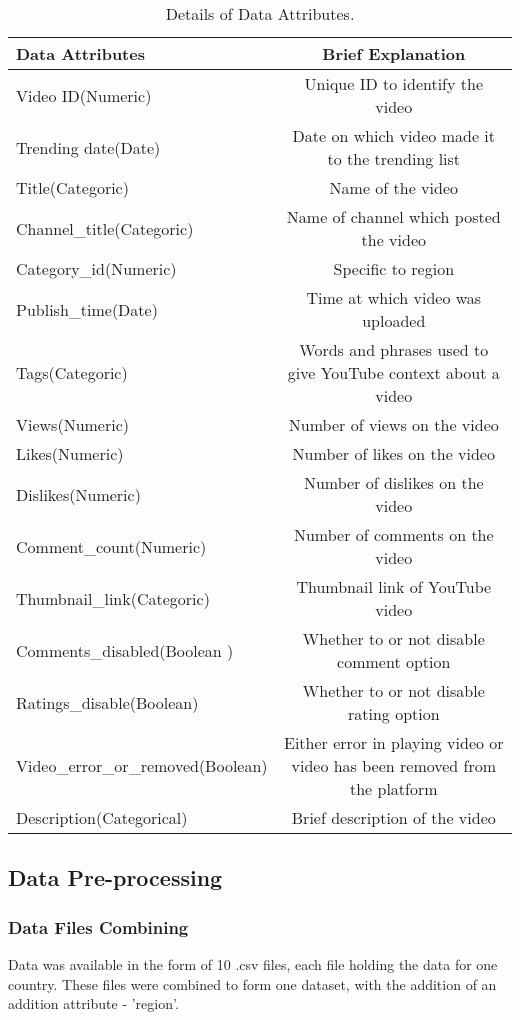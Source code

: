 \documentclass[runningheads]{llncs}
\begin{document}
\begin{table}[H]
\centering
\begin{tabular}{|l|c|}
\hline
\textbf{Data Attributes} &  \textbf{Brief Explanation}\\
\hline
Video ID(Numeric) & Unique ID to identify the video \\  	                                                    
\hline
Trending date(Date) & Date on which video made it to the trending list\\
\hline
Title(Categoric) & Name of the video\\
\hline
Channel_title(Categoric) & Name of channel which posted the video\\
\hline
Category_id(Numeric) & Specific to region\\
\hline
Publish_time(Date) & Time at which video was uploaded\\
\hline
Tags(Categoric) & Words and phrases used to give YouTube context about a video\\
\hline
Views(Numeric) & Number of views on the video\\
\hline
Likes(Numeric) & Number of likes on the video\\
\hline
Dislikes(Numeric) & Number of dislikes on the video\\
\hline
Comment_count(Numeric) & Number of comments on the video\\
\hline
Thumbnail_link(Categoric) & Thumbnail link of YouTube video\\
\hline
Comments_disabled(Boolean )& Whether to or not disable comment option\\
\hline
Ratings_disable(Boolean) & Whether to or not disable rating option\\
\hline
Video_error_or_removed(Boolean) & Either error in playing video or video has been removed from the platform\\
\hline
Description(Categorical) & Brief description of the video\\
\hline
\end{tabular}
\caption{Details of Data Attributes.}
\label{tbl:dataset-attributes}
\end{table}

\subsection{Data Pre-processing}
\subsubsection{Data Files Combining}
Data was available in the form of 10 .csv files, each file holding the data for one country.
These files were combined to form one dataset, with the addition of an addition attribute - 'region'.
\end{document}
